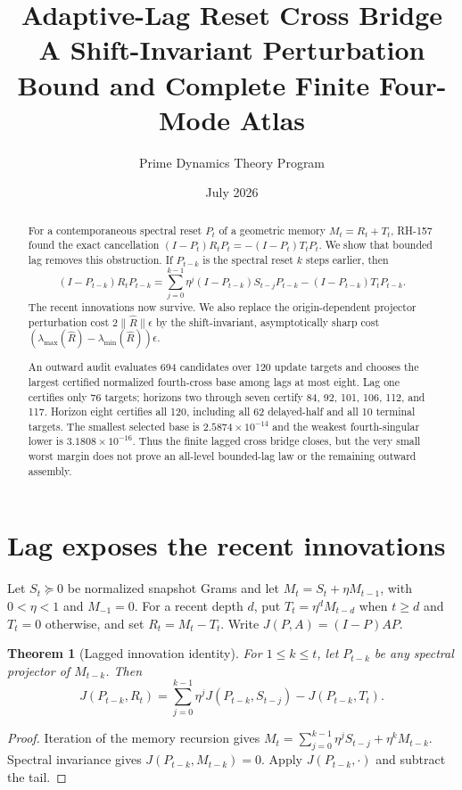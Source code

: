 \documentclass[12pt]{article}
\title{Adaptive-Lag Reset Cross Bridge\\\large A Shift-Invariant Perturbation Bound and Complete Finite Four-Mode Atlas}
\author{Prime Dynamics Theory Program}
\date{July 2026}
\newtheorem{theorem}{Theorem}
\begin{document}
\maketitle

\begin{abstract}
For a contemporaneous spectral reset $P_t$ of a geometric memory $M_t=R_t+T_t$,
RH-157 found the exact cancellation $(I-P_t)R_tP_t=-(I-P_t)T_tP_t$.
We show that bounded lag removes this obstruction.  If $P_{t-k}$ is the
spectral reset $k$ steps earlier, then
\[
 (I-P_{t-k})R_tP_{t-k}
 =\sum_{j=0}^{k-1}\eta^j(I-P_{t-k})S_{t-j}P_{t-k}
  -(I-P_{t-k})T_tP_{t-k}.
\]
The recent innovations now survive.  We also replace the origin-dependent
projector perturbation cost $2\|\widehat R\|\epsilon$ by the shift-invariant,
asymptotically sharp cost
$(\lambda_{\max}(\widehat R)-\lambda_{\min}(\widehat R))\epsilon$.

An outward audit evaluates 694 candidates over 120 update targets and chooses
the largest certified normalized fourth-cross base among lags at most eight.
Lag one certifies only 76 targets; horizons two through seven certify
84, 92, 101, 106, 112, and 117.  Horizon eight certifies all 120, including
all 62 delayed-half and all 10 terminal targets.  The smallest selected base
is $2.5874\times10^{-14}$ and the weakest fourth-singular lower is
$3.1808\times10^{-16}$.  Thus the finite lagged cross bridge closes, but the
very small worst margin does not prove an all-level bounded-lag law or the
remaining outward assembly.
\end{abstract}

\section{Lag exposes the recent innovations}
Let $S_t\succeq0$ be normalized snapshot Grams and let
$M_t=S_t+\eta M_{t-1}$, with $0<\eta<1$ and $M_{-1}=0$.  For a recent depth
$d$, put $T_t=\eta^dM_{t-d}$ when $t\geq d$ and $T_t=0$ otherwise, and set
$R_t=M_t-T_t$.  Write $J(P,A)=(I-P)AP$.

\begin{theorem}[Lagged innovation identity]\label{thm:lag}
For $1\leq k\leq t$, let $P_{t-k}$ be any spectral projector of $M_{t-k}$.
Then
\[
 J(P_{t-k},R_t)=\sum_{j=0}^{k-1}\eta^jJ(P_{t-k},S_{t-j})
                  -J(P_{t-k},T_t).
\]
\end{theorem}
\begin{proof}
Iteration of the memory recursion gives
$M_t=\sum_{j=0}^{k-1}\eta^jS_{t-j}+\eta^kM_{t-k}$.
Spectral invariance gives $J(P_{t-k},M_{t-k})=0$.  Apply $J(P_{t-k},\cdot)$
and subtract the tail.
\end{proof}
\end{document}
